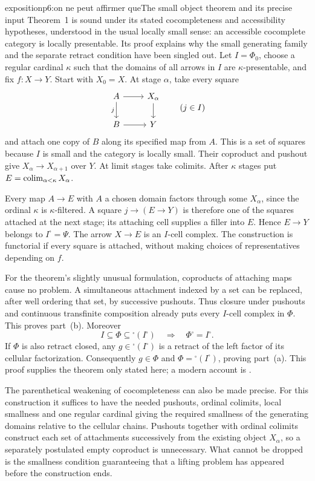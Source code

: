 \begin{dcomment}{exposition}{p6:on ne peut affirmer que}{The small object theorem and its precise input}
Theorem~1 is sound under its stated cocompleteness and accessibility hypotheses, understood in the usual locally small sense: an accessible cocomplete category is locally presentable. Its proof explains why the small generating family and the separate retract condition have been singled out. Let $I=\Phi_0$, choose a regular cardinal $\kappa$ such that the domains of all arrows in $I$ are $\kappa$-presentable, and fix $f:X\to Y$. Start with $X_0=X$. At stage $\alpha$, take every square
\[
\begin{tikzcd}
A\arrow[r]\arrow[d,"j"'] &X_\alpha\arrow[d]\\
B\arrow[r]&Y
\end{tikzcd}
\qquad(j\in I)
\]
and attach one copy of $B$ along its specified map from $A$. This is a set of squares because $I$ is small and the category is locally small. Their coproduct and pushout give $X_\alpha\to X_{\alpha+1}$ over $Y$. At limit stages take colimits. After $\kappa$ stages put $E=\mathop{\rm colim}_{\alpha<\kappa}X_\alpha$.

Every map $A\to E$ with $A$ a chosen domain factors through some $X_\alpha$, since the ordinal $\kappa$ is $\kappa$-filtered. A square $j\to(E\to Y)$ is therefore one of the squares attached at the next stage; its attaching cell supplies a filler into $E$. Hence $E\to Y$ belongs to $I^{\square}=\Psi$. The arrow $X\to E$ is an $I$-cell complex. The construction is functorial if every square is attached, without making choices of representatives depending on $f$.

For the theorem's slightly unusual formulation, coproducts of attaching maps cause no problem. A simultaneous attachment indexed by a set can be replaced, after well ordering that set, by successive pushouts. Thus closure under pushouts and continuous transfinite composition already puts every $I$-cell complex in $\Phi$. This proves part~(b). Moreover
\[
 I\subseteq\Phi\subseteq{}^{\square}(I^{\square})
 \quad\Longrightarrow\quad \Phi^{\square}=I^{\square}.
\]
If $\Phi$ is also retract closed, any $g\in{}^{\square}(I^{\square})$ is a retract of the left factor of its cellular factorization. Consequently $g\in\Phi$ and $\Phi={} ^{\square}(I^{\square})$, proving part~(a). This proof supplies the theorem only stated here; a modern account is \citet[Theorem~12.2.2 and Corollary~12.2.4]{Riehl2014}.

The parenthetical weakening of cocompleteness can also be made precise. For this construction it suffices to have the needed pushouts, ordinal colimits, local smallness and one regular cardinal giving the required smallness of the generating domains relative to the cellular chains. Pushouts together with ordinal colimits construct each set of attachments successively from the existing object $X_\alpha$, so a separately postulated empty coproduct is unnecessary. What cannot be dropped is the smallness condition guaranteeing that a lifting problem has appeared before the construction ends.
\end{dcomment}


